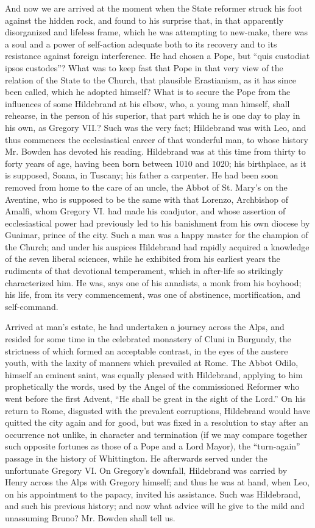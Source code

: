 And now we are arrived at the moment when the
State reformer struck his foot against the hidden rock, and found to
his surprise that, in that apparently disorganized and lifeless frame,
which he was attempting to new-make, there was a soul and a power of
self-action adequate both to its recovery and to its resistance
against foreign interference. He had chosen a Pope, but ``quis
custodiat ipsos custodes''? What was to keep fast that Pope in that
very view of the relation of the State to the Church, that plausible
Erastianism, as it has since been called, which he adopted himself?
What is to secure the Pope from the influences of some Hildebrand at
his elbow, who, a young man himself, shall rehearse, in the person of
his superior, that part which he is one day to play in his own, as
Gregory VII.? Such was the very fact; Hildebrand was with Leo, and
thus commences the ecclesiastical career of that wonderful man, to
whose history Mr. Bowden has devoted his reading. Hildebrand was
at this time from thirty to forty years of age, having been born
between 1010 and 1020; his birthplace, as it is supposed, Soana, in
Tuscany; his father a carpenter. He had been soon removed from home to
the care of an uncle, the Abbot of St. Mary's on the Aventine, who is
supposed to be the same with that Lorenzo, Archbishop of Amalfi, whom
Gregory VI. had made his coadjutor, and whose assertion of
ecclesiastical power had previously led to his banishment from his own
diocese by Guaimar, prince of the city. Such a man was a happy master
for the champion of the Church; and under his auspices Hildebrand had
rapidly acquired a knowledge of the seven liberal sciences, while he
exhibited from his earliest years the rudiments of that devotional
temperament, which in after-life so strikingly characterized him. He
was, says one of his annalists, a monk from his boyhood; his life,
from its very commencement, was one of abstinence, mortification, and
self-command.

Arrived at man's estate, he had undertaken a
journey across the Alps, and resided for some time in the celebrated
monastery of Cluni in Burgundy, the strictness of which formed an
acceptable contrast, in the eyes of the austere youth, with the laxity
of manners which prevailed at Rome. The Abbot Odilo, himself an
eminent saint, was equally pleased with Hildebrand, applying to him
prophetically the words, used by the Angel of the commissioned
Reformer who went before the first Advent, ``He shall be great in the
sight of the Lord.'' On his return to Rome, disgusted with the
prevalent corruptions, Hildebrand would have quitted the city again
and for good, but was fixed in a resolution to stay after an
occurrence not unlike, in character and termination (if we may compare
together such opposite fortunes as those of a Pope and a Lord
Mayor), the ``turn-again'' passage in the history of Whittington. He
afterwards served under the unfortunate Gregory VI. On Gregory's
downfall, Hildebrand was carried by Henry across the Alps with Gregory
himself; and thus he was at hand, when Leo, on his appointment to the
papacy, invited his assistance. Such was Hildebrand, and such his
previous history; and now what advice will he give to the mild and
unassuming Bruno? Mr. Bowden shall tell us.

